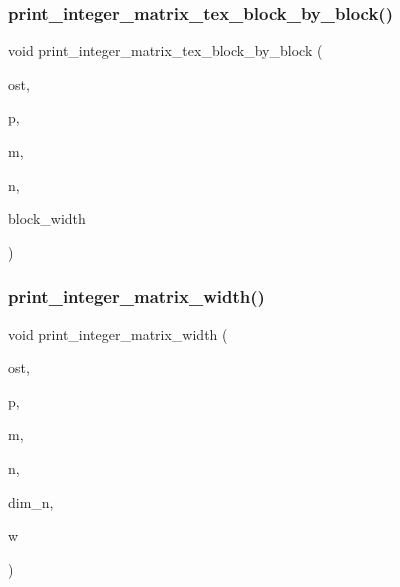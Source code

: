 \subsubsection{\texorpdfstring{print\+\_\+integer\+\_\+matrix\+\_\+tex\+\_\+block\+\_\+by\+\_\+block()}{print\_integer\_matrix\_tex\_block\_by\_block()}}
{\footnotesize\ttfamily void print\+\_\+integer\+\_\+matrix\+\_\+tex\+\_\+block\+\_\+by\+\_\+block (\begin{DoxyParamCaption}\item[{ostream \&}]{ost,  }\item[{\mbox{\hyperlink{galois_8h_a09fddde158a3a20bd2dcadb609de11dc}{I\+NT}} $\ast$}]{p,  }\item[{\mbox{\hyperlink{galois_8h_a09fddde158a3a20bd2dcadb609de11dc}{I\+NT}}}]{m,  }\item[{\mbox{\hyperlink{galois_8h_a09fddde158a3a20bd2dcadb609de11dc}{I\+NT}}}]{n,  }\item[{\mbox{\hyperlink{galois_8h_a09fddde158a3a20bd2dcadb609de11dc}{I\+NT}}}]{block\+\_\+width }\end{DoxyParamCaption})}

\mbox{\label{util_8_c_aa78f3e73fc2179251bd15adbcc31573f}} 
\subsubsection{\texorpdfstring{print\+\_\+integer\+\_\+matrix\+\_\+width()}{print\_integer\_matrix\_width()}}
{\footnotesize\ttfamily void print\+\_\+integer\+\_\+matrix\+\_\+width (\begin{DoxyParamCaption}\item[{ostream \&}]{ost,  }\item[{\mbox{\hyperlink{galois_8h_a09fddde158a3a20bd2dcadb609de11dc}{I\+NT}} $\ast$}]{p,  }\item[{\mbox{\hyperlink{galois_8h_a09fddde158a3a20bd2dcadb609de11dc}{I\+NT}}}]{m,  }\item[{\mbox{\hyperlink{galois_8h_a09fddde158a3a20bd2dcadb609de11dc}{I\+NT}}}]{n,  }\item[{\mbox{\hyperlink{galois_8h_a09fddde158a3a20bd2dcadb609de11dc}{I\+NT}}}]{dim\+\_\+n,  }\item[{\mbox{\hyperlink{galois_8h_a09fddde158a3a20bd2dcadb609de11dc}{I\+NT}}}]{w }\end{DoxyParamCaption})}

